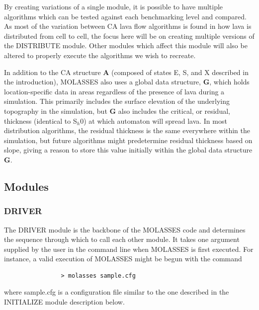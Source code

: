 \documentclass[12pt,letter]{article}
\begin{document}
	By creating variations of a single module, it is possible to have multiple algorithms which can be tested against each benchmarking level and compared. As most of the variation between CA lava flow algorithms is found in how lava is distributed from cell to cell, the focus here will be on creating multiple versions of the DISTRIBUTE module. Other modules which affect this module will also be altered to properly execute the algorithms we wish to recreate.
	
	In addition to the CA structure \textbf{A} (composed of states E, S, and X described in the introduction), MOLASSES also uses a global data structure, \textbf{G}, which holds location-specific data in areas regardless of the presence of lava during a simulation. This primarily includes the surface elevation of the underlying topography in the simulation, but \textbf{G} also includes the critical, or residual, thickness (identical to S$_h0$) at which automaton will spread lava. In most distribution algorithms, the residual thickness is the same everywhere within the simulation, but future algorithms might predetermine residual thickness based on slope, giving a reason to store this value initially within the global data structure \textbf{G}.

	\subsection{Modules}
		\subsubsection{DRIVER}
			The DRIVER module is the backbone of the MOLASSES code and determines the sequence through which to call each other module. It takes one argument supplied by the user in the command line when MOLASSES is first executed. For instance, a valid execution of MOLASSES might be begun with the command
			\begin{verbatim}
				> molasses sample.cfg
			\end{verbatim}
			where sample.cfg is a configuration file similar to the one described in the INITIALIZE module description below. 
			
\end{document}
